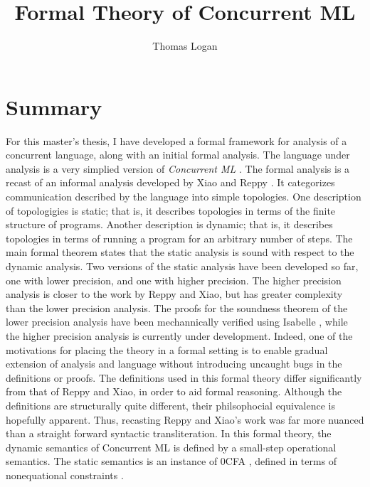 \documentclass{article}
\title{Formal Theory of Concurrent ML}
\author{Thomas Logan}
\begin{document}
\maketitle
{}

\newpage
{}


\section{Summary}
For this master's thesis, I have developed a formal framework for analysis of
a concurrent language, along with an initial formal analysis.  The language under analysis is
a very simplied version of \textit{Concurrent ML} \cite{concurrent_ml}. The formal analysis
is a recast of an informal analysis developed by Xiao and Reppy \cite{specialization}. It
categorizes communication described by the language into simple topologies. One description of
topologigies is static; that is, it describes topologies in terms of the finite structure of
programs.  Another description is dynamic; that is, it describes topologies in terms of running
a program for an arbitrary number of steps. The main formal theorem states that the static
analysis is sound with respect to the dynamic analysis. Two versions of the static analysis
have been developed so far, one with lower precision, and one with higher precision. The higher
precision analysis is closer to the work by Reppy and Xiao, but has greater complexity than the
lower precision analysis. The proofs for the soundness theorem of the lower precision analysis
have been mechannically verified using Isabelle \cite{isabelle}, while the higher precision
analysis is currently under development. Indeed, one of the motivations for placing the theory
in a formal setting is to enable gradual extension of analysis and language without introducing
uncaught bugs in the definitions or proofs. The definitions used in this formal theory differ
significantly from that of Reppy and Xiao, in order to aid formal reasoning. Although the
definitions are structurally quite different, their philsophocial equivalence is hopefully
apparent. Thus, recasting Reppy and Xiao's work was far more nuanced than a straight forward
syntactic transliteration. In this formal theory, the dynamic semantics of Concurrent ML is
defined by a small-step operational semantics. The static semantics is an instance of 0CFA
\cite{0cfa}, defined in terms of nonequational constraints \cite{program_analysis}.
\end{document}
